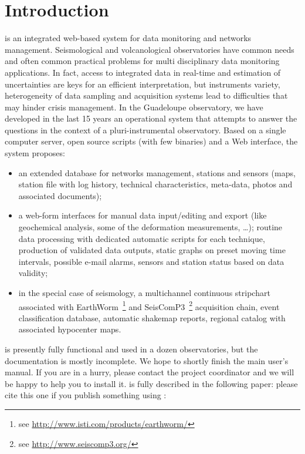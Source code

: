 
\chapter{Introduction}

\webobs is an integrated web-based system for data monitoring and networks management. Seismological and volcanological observatories have common needs and often common practical problems for multi disciplinary data monitoring applications. In fact, access to integrated data in real-time and estimation of uncertainties are keys for an efficient interpretation, but instruments variety, heterogeneity of data sampling and acquisition systems lead to difficulties that may hinder crisis management. In the Guadeloupe observatory, we have developed in the last 15 years an operational system that attempts to answer the questions in the context of a pluri-instrumental observatory. Based on a single computer server, open source scripts (with few binaries) and a Web interface, the system proposes:

\begin{itemize}
	\item  an extended database for networks management, stations and sensors (maps, station file with log history, technical characteristics, meta-data, photos and associated documents);
	\item  a web-form interfaces for manual data input/editing and export (like geochemical analysis, some of the deformation measurements, …); routine data processing with dedicated automatic scripts for each technique, production of validated data outputs, static graphs on preset moving time intervals, possible e-mail alarms, sensors and station status based on data validity;
	\item  in the special case of seismology, a multichannel continuous stripchart associated with EarthWorm~\footnote{see \url{http://www.isti.com/products/earthworm/}} and SeisComP3~\footnote{see \url{http://www.seiscomp3.org/}} acquisition chain, event classification database, automatic shakemap reports, regional catalog with associated hypocenter maps.
\end{itemize}

\webobs is presently fully functional and used in a dozen observatories, but the documentation is mostly incomplete. We hope to shortly finish the main user’s manual. If you are in a hurry, please contact the project coordinator and we will be happy to help you to install it. \webobs is fully described in the following paper: please cite this one if you publish something using \webobs:

